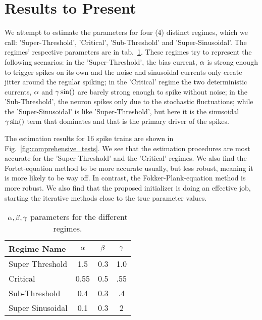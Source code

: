 \documentclass[a4paper,11pt]{article}
\begin{document}
\section*{Results to Present}
We attempt to estimate the parameters for four (4) distinct regimes, which we
call: 'Super-Threshold', 'Critical', 'Sub-Threshold' and 'Super-Sinusoidal'. The
regimes' respective parameters are in tab.\ \ref{tab:regimes}. These regimes try
to represent the following scenarios: in the 'Super-Threshold', the bias
current, ${\alpha}$ is strong enough to trigger spikes on its own and the noise and
sinusoidal currents only create jitter around the regular spiking;  in the
'Critical' regime the two deterministic currents, ${\alpha}$ and ${\gamma } \sin()$ are
barely strong enough to spike without noise; in the 'Sub-Threshold', the neuron
spikes only due to the stochastic fluctuations; while the 'Super-Sinusoidal' is
like 'Super-Threshold', but here it is the sinusoidal ${\gamma } \sin()$ term that
dominates and that is the primary driver of the spikes. 

The estimation results for 16 spike trains are shown in Fig.\
\ref{fig:comprehensive_tests}. We see that the estimation procedures are most
accurate for the 'Super-Threshold' and the 'Critical' regimes. We also find the
Fortet-equation method to be more accurate usually, but less robust, meaning it
is more likely to be way off. In contrast, the Fokker-Plank-equation method is
more robust. We also find that the proposed initializer is doing an effective
job, starting the iterative methods close to the true parameter values. 

\begin{table}[h]
\begin{center}
\begin{tabular}{l|ccc}
Regime Name & ${\alpha}$ & ${\beta}$ & ${\gamma }$ \\
\hline
Super Threshold & 
1.5 & 0.3 & 1.0 \\ 
Critical &
0.55 & 0.5 & .55 \\ 
Sub-Threshold &
0.4 & 0.3 & .4 \\ 
Super Sinusoidal &
0.1 & 0.3 & 2  
\end{tabular}
\caption{${{\alpha},{\beta},{\gamma } }$ parameters for the different regimes.}
\label{tab:regimes}
\end{center}
\end{table} 
\end{document}
